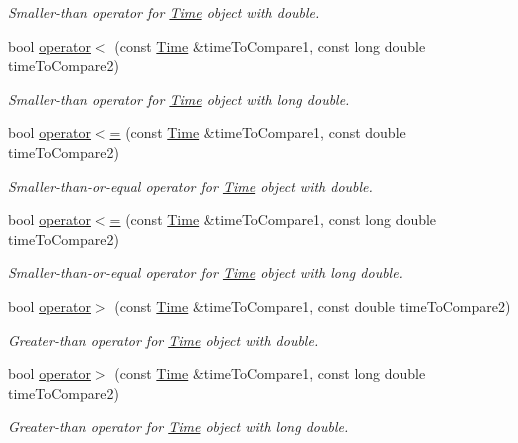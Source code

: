 \begin{DoxyCompactItemize}
\begin{DoxyCompactList}\small\item\em Smaller-\/than operator for \hyperlink{classtudat_1_1Time}{Time} object with double. \end{DoxyCompactList}\item 
bool \hyperlink{classtudat_1_1Time_a8a87ee3b43ecbab8f7a9e30431a1c866}{operator$<$} (const \hyperlink{classtudat_1_1Time}{Time} \&time\+To\+Compare1, const long double time\+To\+Compare2)
\begin{DoxyCompactList}\small\item\em Smaller-\/than operator for \hyperlink{classtudat_1_1Time}{Time} object with long double. \end{DoxyCompactList}\item 
bool \hyperlink{classtudat_1_1Time_a6ec7f250c725f03c68a21950a78a7460}{operator$<$=} (const \hyperlink{classtudat_1_1Time}{Time} \&time\+To\+Compare1, const double time\+To\+Compare2)
\begin{DoxyCompactList}\small\item\em Smaller-\/than-\/or-\/equal operator for \hyperlink{classtudat_1_1Time}{Time} object with double. \end{DoxyCompactList}\item 
bool \hyperlink{classtudat_1_1Time_abb04b21fae09811cd82a00a98abe2c7e}{operator$<$=} (const \hyperlink{classtudat_1_1Time}{Time} \&time\+To\+Compare1, const long double time\+To\+Compare2)
\begin{DoxyCompactList}\small\item\em Smaller-\/than-\/or-\/equal operator for \hyperlink{classtudat_1_1Time}{Time} object with long double. \end{DoxyCompactList}\item 
bool \hyperlink{classtudat_1_1Time_a8a1453a3f396420c4f23da89d4901095}{operator$>$} (const \hyperlink{classtudat_1_1Time}{Time} \&time\+To\+Compare1, const double time\+To\+Compare2)
\begin{DoxyCompactList}\small\item\em Greater-\/than operator for \hyperlink{classtudat_1_1Time}{Time} object with double. \end{DoxyCompactList}\item 
bool \hyperlink{classtudat_1_1Time_aaeab0108e0bbde4b8450a12f7ce5dc2b}{operator$>$} (const \hyperlink{classtudat_1_1Time}{Time} \&time\+To\+Compare1, const long double time\+To\+Compare2)
\begin{DoxyCompactList}\small\item\em Greater-\/than operator for \hyperlink{classtudat_1_1Time}{Time} object with long double. \end{DoxyCompactList}\item 

\end{DoxyCompactItemize}
